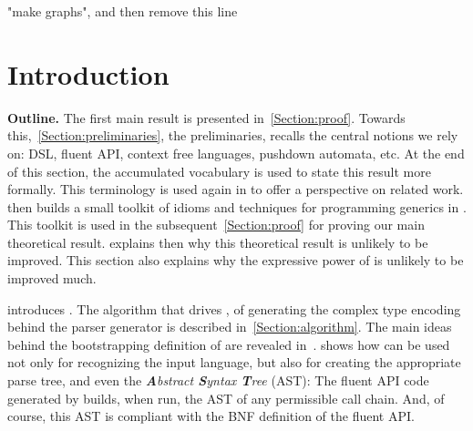 \documentclass[a4paper,USenglish]{lipics}
\author{Anonymized for the submission}
\begin{document}
\makesureyourun "make graphs", and then remove this line
%

\maketitle
\begin{abstract}
  
\end{abstract}

\section{Introduction}


\textbf{Outline.}
The first main result is presented in~\cref{Section:proof}.
Towards this,~\cref{Section:preliminaries}, the preliminaries, 
  recalls the central notions we rely on: DSL, fluent API,
  context free languages, pushdown automata, etc. 
At the end of this section, the accumulated vocabulary is used to state this
  result more formally.
This terminology is used again in  to offer 
  a perspective on related work.
 then builds a small toolkit of idioms and techniques
  for programming generics in \Java.
This toolkit is used in the subsequent~\cref{Section:proof} for
  proving our main theoretical result.
 explains then why
  this theoretical result is unlikely to be improved.
This section also explains why the expressive power of \Self
  is unlikely to be improved much.

 introduces \Self.
The algorithm that drives \Self, of generating the complex
  type encoding behind the parser generator
  is described in~\cref{Section:algorithm}.
The main ideas behind the bootstrapping definition of \Self
  are revealed in~.
 shows how \Self can be used not only
  for recognizing the input language,
  but also for creating the appropriate parse tree, and even the \emph{\textbf Abstract \textbf Syntax \textbf Tree} (AST):
  The fluent API code generated by \Self builds,
    when run, the AST of any permissible call chain.
    And, of course, this AST is compliant with the BNF definition
      of the fluent API.
\end{document}
